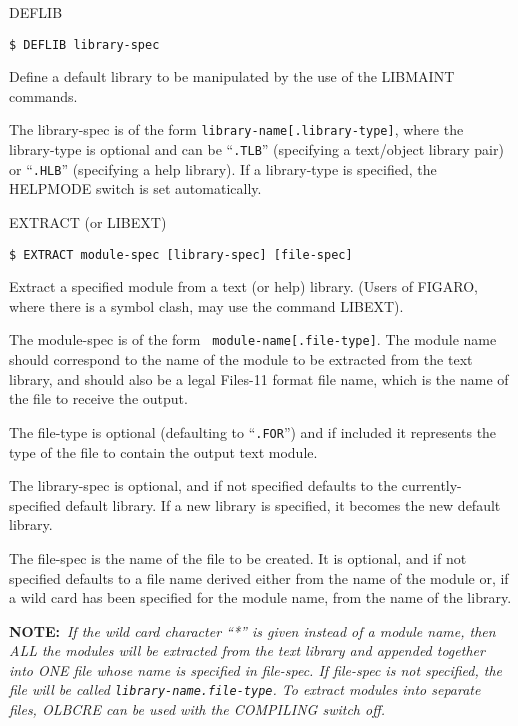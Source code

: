 \begin{list}{}{\setlength{\labelwidth}{\numlen}\setlength{\leftmargin}{\numlen}
\addtolength{\leftmargin}{\labelsep}}

\item[DEFLIB]
\begin{verbatim}
$ DEFLIB library-spec
\end{verbatim}
Define a default library to be manipulated by the use of
the LIBMAINT commands.

The library-spec is of the form {\tt library-name[.library-type]}, where the
library-type is optional and can be ``{\tt .TLB}'' (specifying a text/object
library pair) or ``{\tt .HLB}'' (specifying a help library).
If a library-type is specified, the HELPMODE switch is set
automatically.

\item[EXTRACT (or LIBEXT)]
\begin{verbatim}
$ EXTRACT module-spec [library-spec] [file-spec]
\end{verbatim}
Extract a specified module from a text (or help) library.
(Users of FIGARO, where there is a symbol clash, may use
the command LIBEXT).

The module-spec is of the form ~{\tt module-name[.file-type]}.
The module name should correspond to the name of the module to be
extracted from the text library, and should also be a legal Files-11
format file name, which is the name of the file to receive the output.

The file-type is optional (defaulting to ``{\tt .FOR}'') and if included it
represents the type of the file to contain the output text module.

The library-spec is optional, and if not specified defaults to the
currently-specified default library.
If a new library is specified, it becomes the new default library.

The file-spec is the name of the file to be created.
It is optional, and if not specified defaults to a file name
derived either from the name of the module or,
if a wild card has been specified for the module name, from the name of
the library.

{\bf NOTE:}~{\it If the wild card character ``*'' is given instead of a module
name, then ALL the modules will be extracted from the text library and appended
together into ONE file whose name is specified in file-spec. If file-spec is
not specified, the file will be called {\tt library-name.file-type}.
To extract modules into separate files, OLBCRE can be used with
the COMPILING switch off.}


\end{list}
